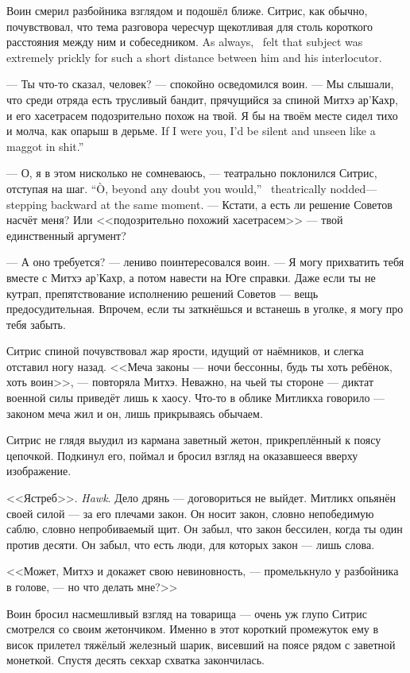 Воин смерил разбойника взглядом и подошёл ближе.
{Ситрис, как обычно, почувствовал, что тема разговора чересчур щекотливая для столь короткого расстояния между ним и собеседником.}
{As always, \Sitris\ felt that subject was extremely prickly for such a short distance between him and his interlocutor.}

--- Ты что-то сказал, человек? --- спокойно осведомился воин.
--- Мы слышали, что среди отряда есть трусливый бандит, прячущийся за спиной Митхэ ар'Кахр, и его хасетрасем подозрительно похож на твой.
{Я бы на твоём месте сидел тихо и молча, как опарыш в дерьме.}
{If I were you, I'd be silent and unseen like a maggot in shit.''}

{--- О, я в этом нисколько не сомневаюсь, --- театрально поклонился Ситрис, отступая на шаг.}
{``\`{O}, beyond any doubt you would,'' \Sitris\ theatrically nodded---stepping backward at the same moment.}
--- Кстати, а есть ли решение Советов насчёт меня?
Или <<подозрительно похожий хасетрасем>> --- твой единственный аргумент?

--- А оно требуется? --- лениво поинтересовался воин.
--- Я могу прихватить тебя вместе с Митхэ ар'Кахр, а потом навести на Юге справки.
Даже если ты не кутрап, препятствование исполнению решений Советов --- вещь предосудительная.
Впрочем, если ты заткнёшься и встанешь в уголке, я могу про тебя забыть.

Ситрис спиной почувствовал жар ярости, идущий от наёмников, и слегка отставил ногу назад.
<<Меча законы --- ночи бессонны, будь ты хоть ребёнок, хоть воин>>, --- повторяла Митхэ.
Неважно, на чьей ты стороне --- диктат военной силы приведёт лишь к хаосу.
Что-то в облике Митликха говорило --- законом меча жил и он, лишь прикрываясь обычаем.

Ситрис не глядя выудил из кармана заветный жетон, прикреплённый к поясу цепочкой.
Подкинул его, поймал и бросил взгляд на оказавшееся вверху изображение.

{<<Ястреб>>.}
{\emph{Hawk}.}
Дело дрянь --- договориться не выйдет.
Митликх опьянён своей силой --- за его плечами закон.
Он носит закон, словно непобедимую саблю, словно непробиваемый щит.
Он забыл, что закон бессилен, когда ты один против десяти.
Он забыл, что есть люди, для которых закон --- лишь слова.

<<Может, Митхэ и докажет свою невиновность, --- промелькнуло у разбойника в голове, --- но что делать мне?>>

Воин бросил насмешливый взгляд на товарища --- очень уж глупо Ситрис смотрелся со своим жетончиком.
Именно в этот короткий промежуток ему в висок прилетел тяжёлый железный шарик, висевший на поясе рядом с заветной монеткой.
Спустя десять секхар схватка закончилась.

